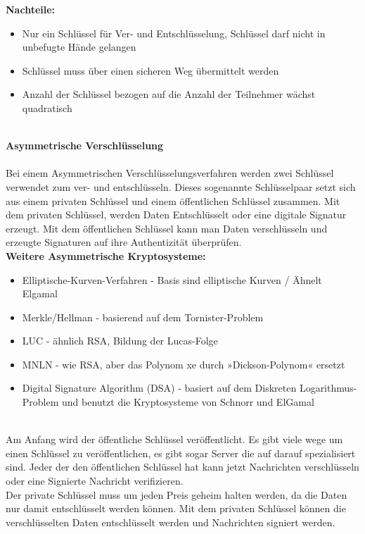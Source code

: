 \documentclass{report}
\begin{document}
\textbf{Nachteile:}
\begin{itemize}
    \item Nur ein Schlüssel für Ver- und Entschlüsselung, Schlüssel darf nicht in unbefugte Hände gelangen
    \item Schlüssel muss über einen sicheren Weg übermittelt werden
    \item Anzahl der Schlüssel bezogen auf die Anzahl der Teilnehmer wächst quadratisch
\end{itemize}\cite{1} \\

\huge \textbf{Asymmetrische Verschlüsselung} \normalsize 
\\
\\
Bei einem Asymmetrischen Verschlüsselungsverfahren werden zwei Schlüssel verwendet zum ver- und entschlüsseln. Dieses sogenannte Schlüsselpaar setzt sich aus einem privaten Schlüssel und einem öffentlichen Schlüssel zusammen. Mit dem privaten Schlüssel, werden Daten Entschlüsselt oder eine digitale Signatur erzeugt. Mit dem öffentlichen Schlüssel kann man Daten verschlüsseln und erzeugte Signaturen auf ihre Authentizität überprüfen.\\

\textbf{Weitere Asymmetrische Kryptosysteme:}
\begin{itemize}
    \item Elliptische-Kurven-Verfahren - Basis sind elliptische Kurven / Ähnelt Elgamal
    \item Merkle/Hellman - basierend auf dem Tornister-Problem
    \item LUC - ähnlich RSA, Bildung der Lucas-Folge
    \item MNLN - wie RSA, aber das Polynom xe durch »Dickson-Polynom« ersetzt
    \item Digital Signature Algorithm (DSA) - basiert auf dem Diskreten Logarithmus- Problem und benutzt die Kryptosysteme von Schnorr und ElGamal
\end{itemize}
\cite{2} \\

Am Anfang wird der öffentliche Schlüssel veröffentlicht. Es gibt viele wege um einen Schlüssel zu veröffentlichen, es gibt sogar Server die auf darauf spezialisiert sind. Jeder der den öffentlichen Schlüssel hat kann jetzt Nachrichten verschlüsseln oder eine Signierte Nachricht verifizieren. \\

Der private Schlüssel muss um jeden Preis geheim halten werden, da die Daten nur damit entschlüsselt werden können. Mit dem privaten Schlüssel können die verschlüsselten Daten entschlüsselt werden und Nachrichten signiert werden.\\
\end{document}
